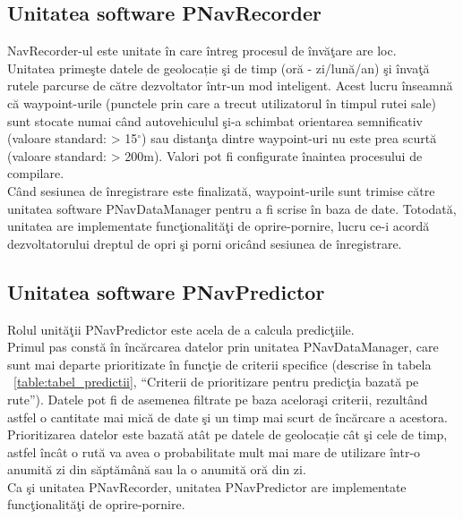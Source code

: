 \subsection{Unitatea software PNavRecorder} 
NavRecorder-ul este unitate în care întreg procesul de învăţare are loc. 
\vspace{6pt}
\\Unitatea primeşte datele de geolocație şi de timp (oră - zi/lună/an) şi învaţă rutele parcurse de către dezvoltator într-un mod inteligent.
Acest lucru înseamnă că waypoint-urile (punctele prin care a trecut utilizatorul în timpul rutei sale) sunt stocate numai când autovehiculul şi-a schimbat 
orientarea semnificativ (valoare standard: > 15$^{\circ}$) sau distanţa dintre waypoint-uri nu este prea scurtă (valoare standard: > 200m). Valori pot fi configurate înaintea procesului de compilare.
\vspace{6pt}
\\Când sesiunea de înregistrare este finalizată, waypoint-urile sunt trimise către unitatea software PNavDataManager pentru a fi scrise în baza de date.
Totodată, unitatea are implementate funcţionalităţi de oprire-pornire, lucru ce-i acordă dezvoltatorului dreptul de opri şi porni oricând sesiunea de înregistrare.


\subsection{Unitatea software PNavPredictor} 
Rolul unităţii PNavPredictor este acela de a calcula predicţiile. 
\vspace{6pt}
\\Primul pas constă în încărcarea datelor prin unitatea PNavDataManager, care sunt mai departe prioritizate în funcţie de criterii specifice (descrise în tabela ~\ref{table:tabel_predictii}, ``Criterii de prioritizare pentru predicţia bazată pe rute''). Datele pot fi de asemenea filtrate pe baza aceloraşi criterii, rezultând astfel o cantitate mai mică de date şi un timp mai scurt de încărcare a acestora. 
\vspace{6pt}
\\Prioritizarea datelor este bazată atât pe datele de geolocație cât şi cele de timp, astfel încât o rută va avea o probabilitate mult mai mare de utilizare într-o anumită zi din săptămână sau la o anumită oră din zi.
\vspace{6pt}
\\Ca şi unitatea PNavRecorder, unitatea PNavPredictor are implementate funcţionalităţi de oprire-pornire.


